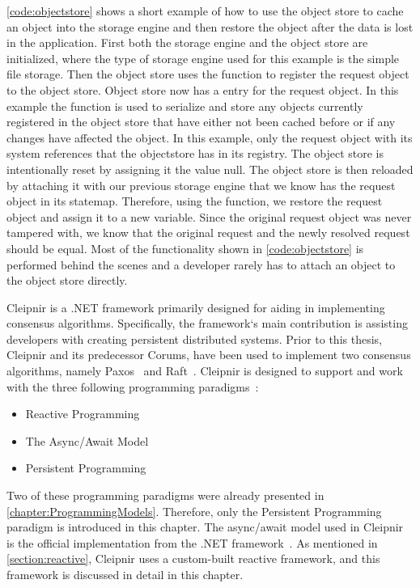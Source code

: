 \autoref{code:objectstore} shows a short example of how to use the object store to cache an object into the storage engine and then restore the object after the data is lost in the application. First both the storage engine and the object store are initialized, where the type of storage engine used for this example is the simple file storage. Then the object store uses the  function to register the request object to the object store. Object store now has a  entry for the request object. In this example the  function is used to serialize and store any objects currently registered in the object store that have either not been cached before or if any changes have affected the object. In this example, only the request object with its system references that the objectstore has in its registry. The object store is intentionally reset by assigning it the value null. The object store is then reloaded by attaching it with our previous storage engine that we know has the request object in its statemap. Therefore, using the  function, we restore the request object and assign it to a new variable. Since the original request object was never tampered with, we know that the original request and the newly resolved request should be equal. Most of the functionality shown in \autoref{code:objectstore} is performed behind the scenes and a developer rarely has to attach an object to the object store directly. 
\fi

Cleipnir is a .NET framework primarily designed for aiding in implementing consensus algorithms. Specifically, the framework`s main contribution is assisting developers with creating persistent distributed systems. Prior to this thesis, Cleipnir and its predecessor Corums, have been used to implement two consensus algorithms, namely Paxos~\cite[p.~32-38]{PAPER:EivindPaper} and Raft~\cite[p.~13-15]{PAPER:PaxosCleipnir}.
Cleipnir is designed to support and work with the three following programming paradigms~\cite[p.~5]{PAPER:PaxosCleipnir}:
\begin{itemize}
\item {Reactive Programming}
\item {The Async/Await Model}
\item {Persistent Programming}
\end{itemize}

Two of these programming paradigms were already presented in \autoref{chapter:ProgrammingModels}. Therefore, only the Persistent Programming paradigm is introduced in this chapter. The async/await model used in Cleipnir is the official implementation from the .NET framework~\cite{DOC:AsyncAwait}. As mentioned in \autoref{section:reactive}, Cleipnir uses a custom-built reactive framework, and this framework is discussed in detail in this chapter.

